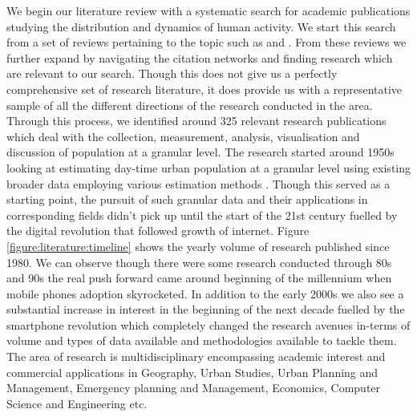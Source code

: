We begin our literature review with a systematic search for academic publications studying the distribution and dynamics of human activity.
We start this search from a set of reviews pertaining to the topic such as \citet{ratti2006, jiang2013, steenbruggen2013, arribas-bel2014} and \citet{li2016}.
From these reviews we further expand by navigating the citation networks and finding research which are relevant to our search.
Though this does not give us a perfectly comprehensive set of research literature, it does provide us with a representative sample of all the different directions of the research conducted in the area.
Through this process, we identified around 325 relevant research publications which deal with the collection, measurement, analysis, visualisation and discussion of population at a granular level.
The research started around 1950s looking at estimating day-time urban population at a granular level using existing  broader data employing various estimation methods \cite{foley1954, schmitt1956}.
Though this served as a starting point, the pursuit of such granular data and their applications in corresponding fields didn't pick up until the start of the 21st century fuelled by the digital revolution that followed growth of internet.
Figure \ref{figure:literature:timeline} shows the yearly volume of research published since 1980.
We can observe though there were some research conducted through 80s and 90s the real push forward came around beginning of the millennium when mobile phones adoption skyrocketed.
In addition to the early 2000s we also see a substantial increase in interest in the beginning of the next decade fuelled by the smartphone revolution which completely changed the research avenues in-terms of volume and types of data available and methodologies available to tackle them.
The area of research is multidisciplinary encompassing academic interest and commercial applications in Geography, Urban Studies, Urban Planning and Management, Emergency planning and Management, Economics, Computer Science and Engineering etc.







